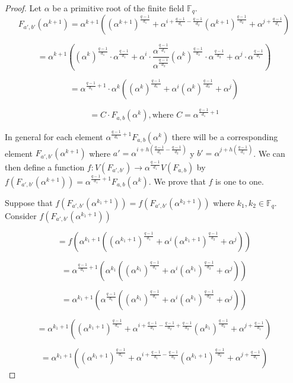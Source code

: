 \documentclass{article}
\theoremstyle{definition}
\theoremstyle{remark}
\numberwithin{equation}{section}
\begin{document}
\begin{proof}
  
  Let $\alpha$ be a primitive root of the finite field $\mathbb{F}_q$. $$F_{a', b'}(\alpha^{k+1}) = \alpha^{k+1}((\alpha^{k+1})^{\frac{q-1}{d_1}} + \alpha^{i + \frac{q-1}{d_1} - \frac{q-1}{d_2}}(\alpha^{k+1})^{\frac{q-1}{d_2}} + \alpha^{j + \frac{q-1}{d_1}})$$

  $$= \alpha^{k+1}((\alpha^{k})^{\frac{q-1}{d_1}} \cdot \alpha^{\frac{q-1}{d_1}} + \alpha^{i} \cdot \frac{\alpha^{\frac{q-1}{d_1}}} {\alpha^{\frac{q-1}{d_2}}} (\alpha^{k})^{\frac{q-1}{d_2}} \cdot \alpha^{\frac{q-1}{d_2}} + \alpha^{j} \cdot \alpha^{\frac{q-1}{d_1}})$$

  $$= \alpha^{\frac{q-1}{d_1} + 1} \cdot \alpha^{k}((\alpha^{k})^{\frac{q-1}{d_1}} + \alpha^{i}(\alpha^{k})^{\frac{q-1}{d_2}} + \alpha^{j} )$$

  $$= C \cdot F_{a,b}(\alpha^k), \mbox{where } C = \alpha^{\frac{q-1}{d_1} + 1}$$

  In general for each element $\alpha^{\frac{q-1}{d_1} + 1}F_{a,b}(\alpha^{k})$ there will be a corresponding element $F_{a',b'}(\alpha^{k+1})$ where $a' = \alpha^{i + h(\frac{q-1}{d_1} - \frac{q-1}{d_2})}$ y $b'= \alpha^{j + h(\frac{q-1}{d_1})}$. We can then define a function $f:V(F_{a',b'}) \rightarrow \alpha^{\frac{q-1}{d_1}}V(F_{a,b})$ by $f(F_{a', b'}(\alpha^{k+1})) = \alpha^{\frac{q-1}{d_1}+1}F_{a, b}(\alpha^k)$. We prove that $f$ is one to one.


  Suppose that $f(F_{a', b'}(\alpha^{k_1+1})) = f(F_{a', b'}(\alpha^{k_2+1}))$ where $k_1, k_2 \in \mathbb{F}_q$. Consider $f(F_{a', b'}(\alpha^{k_1+1}))$

  $$= f(\alpha^{k_1+1}((\alpha^{k_1+1})^{\frac{q-1}{d_1}} + \alpha^{i}(\alpha^{k_1+1})^{\frac{q-1}{d_2}} + \alpha^{j}))$$ 

  $$= \alpha^{\frac{q-1}{d_1}+1}(\alpha^{k_1}((\alpha^{k_1})^{\frac{q-1}{d_1}} + \alpha^{i}(\alpha^{k_1})^{\frac{q-1}{d_2}} + \alpha^{j}))$$ 

  $$= \alpha^{k_1+1}(\alpha^{\frac{q-1}{d_1}}((\alpha^{k_1})^{\frac{q-1}{d_1}} + \alpha^{i}(\alpha^{k_1})^{\frac{q-1}{d_2}} + \alpha^{j}))$$ 

  $$= \alpha^{k_1+1}((\alpha^{k_1+1})^{\frac{q-1}{d_1}} + \alpha^{i + \frac{q-1}{d_1} - \frac{q-1}{d_2} + \frac{q-1}{d_2}}(\alpha^{k_1})^{\frac{q-1}{d_2}} + \alpha^{j + \frac{q-1}{d_1}})$$

  $$= \alpha^{k_1+1}((\alpha^{k_1+1})^{\frac{q-1}{d_1}} + \alpha^{i + \frac{q-1}{d_1} - \frac{q-1}{d_2}}(\alpha^{k_1+1})^{\frac{q-1}{d_2}} + \alpha^{j + \frac{q-1}{d_1}})$$ 


\end{proof}
\end{document}

